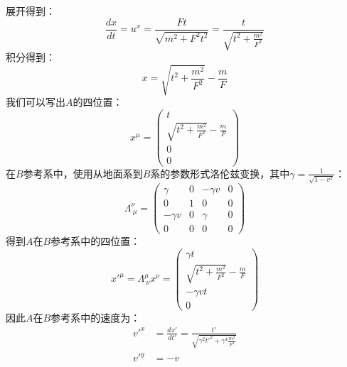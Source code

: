 \documentclass{assignment}
\begin{document}
    展开得到：
    \begin{equation}
        \frac{dx}{dt} = u^x = \frac{Ft}{\sqrt{m^2 + F^2t^2}} = \frac{t}{\sqrt{t^2 + \frac{m^2}{F^2}}}
    \end{equation}
    积分得到：
    \begin{equation}
        x = \sqrt{t^2 + \frac{m^2}{F^2}} - \frac{m}{F}
    \end{equation}
    我们可以写出$A$的四位置：
    \begin{equation}
        x^\mu = \left(
            \begin{array}{c}
                t\\
                \sqrt{t^2 + \frac{m^2}{F^2}} - \frac{m}{F}\\
                0\\
                0
            \end{array}
        \right)
    \end{equation}
    在$B$参考系中，使用从地面系到$B$系的参数形式洛伦兹变换，其中$\gamma = \frac{1}{\sqrt{1-v^2}}$：
    \begin{equation}
        \Lambda^\nu_{\ \mu} = \left(
            \begin{array}{cccc}
                \gamma & 0 & -\gamma v & 0\\
                0 & 1 & 0 & 0\\
                -\gamma v & 0 & \gamma & 0\\
                0 & 0 & 0 & 0
            \end{array}
        \right)
    \end{equation}
    得到$A$在$B$参考系中的四位置：
    \begin{equation}
        x'^\mu = \Lambda^\mu_{\ \nu}x^\nu = \left(
            \begin{array}{c}
                \gamma t\\
                \sqrt{t^2 + \frac{m^2}{F^2}} - \frac{m}{F}\\
                -\gamma vt\\
                0
            \end{array}
        \right)
    \end{equation}
    因此$A$在$B$参考系中的速度为：
    \begin{equation}
        \begin{aligned}
        v'^x &= \frac{dx'}{dt'} = \frac{t'}{\sqrt{\gamma^2 t'^2 + \gamma^4 \frac{m^2}{F^2}}}\\
        v'^y &= -v
        \end{aligned}
    \end{equation}
\end{document}
